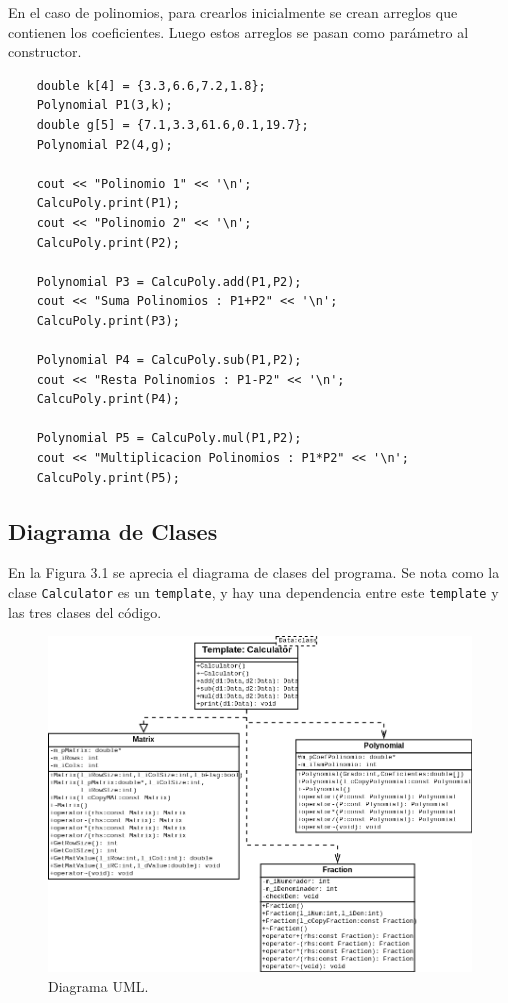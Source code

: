 En el caso de polinomios, para crearlos inicialmente se crean arreglos que contienen los coeficientes. Luego estos arreglos se pasan como parámetro al constructor.

\begin{verbatim}
    double k[4] = {3.3,6.6,7.2,1.8};
    Polynomial P1(3,k);
    double g[5] = {7.1,3.3,61.6,0.1,19.7};
    Polynomial P2(4,g);
    
    cout << "Polinomio 1" << '\n';
    CalcuPoly.print(P1);
    cout << "Polinomio 2" << '\n';
    CalcuPoly.print(P2);
    
    Polynomial P3 = CalcuPoly.add(P1,P2);
    cout << "Suma Polinomios : P1+P2" << '\n';
    CalcuPoly.print(P3);
    
    Polynomial P4 = CalcuPoly.sub(P1,P2);
    cout << "Resta Polinomios : P1-P2" << '\n';
    CalcuPoly.print(P4);
    
    Polynomial P5 = CalcuPoly.mul(P1,P2);
    cout << "Multiplicacion Polinomios : P1*P2" << '\n';
    CalcuPoly.print(P5);
\end{verbatim}

\subsection{Diagrama de Clases}

En la Figura 3.1 se aprecia el diagrama de clases del programa. Se nota como la clase \texttt{Calculator} es un \texttt{template}, y hay una dependencia entre este \texttt{template} y las tres clases del código.

\begin{figure}[H]
\centering
\includegraphics[width=\textwidth]{imgs/Labo4/Diagram2.png}
\caption{Diagrama UML.}
\label{fig:uml}
\end{figure}


